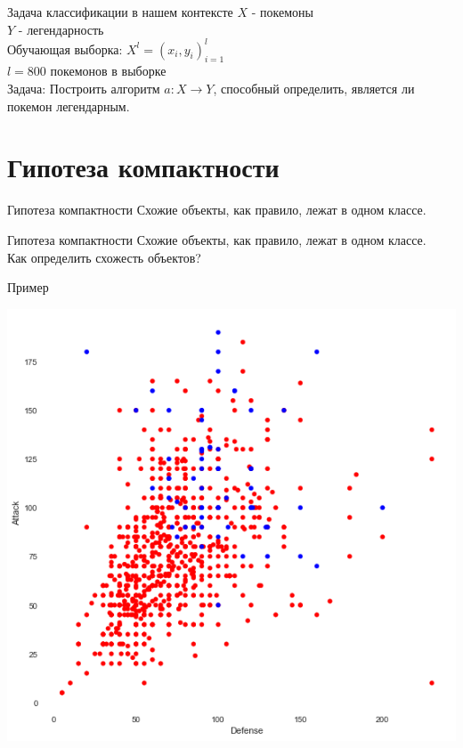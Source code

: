 \documentclass[10pt]{beamer}
\begin{document}
\begin{frame}{Задача классификации в нашем контексте}
	$X$ - покемоны \\
	$Y$ - легендарность \\
	Обучающая выборка: ${X^l = (x_i, y_i)_{i=1}^l}$ \\ 
	$l = 800$ покемонов в выборке\\
	\bigbreak
	\alert{Задача}: Построить алгоритм ${a \colon X \rightarrow Y}$, способный определить, является ли покемон легендарным.
\end{frame}

\section{Гипотеза компактности}

\begin{frame}{Гипотеза компактности}
    \centering
 	Схожие объекты, как правило, лежат в одном классе.\\
\end{frame}

\begin{frame}{Гипотеза компактности}
	Схожие объекты, как правило, лежат в одном классе.\\
	\bigbreak
	Как определить \alert{схожесть} объектов?\\
\end{frame}

\begin{frame}{Пример}
  \begin{center}
    	\includegraphics[width=\linewidth,height=0.8 \textheight,keepaspectratio]{images/attack_vs_defense}  
  \end{center}    
\end{frame}
\end{document}
